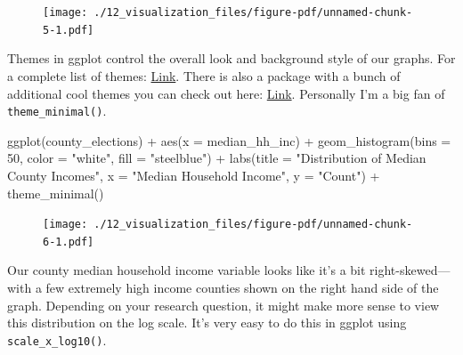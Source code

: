 \documentclass[
  letterpaper,
]{book}
\newenvironment{Shaded}{\begin{snugshade}}{\end{snugshade}}
\newcommand{\AttributeTok}[1]{\textcolor[rgb]{0.40,0.45,0.13}{#1}}
\newcommand{\DecValTok}[1]{\textcolor[rgb]{0.68,0.00,0.00}{#1}}
\newcommand{\FunctionTok}[1]{\textcolor[rgb]{0.28,0.35,0.67}{#1}}
\newcommand{\NormalTok}[1]{\textcolor[rgb]{0.00,0.23,0.31}{#1}}
\newcommand{\SpecialCharTok}[1]{\textcolor[rgb]{0.37,0.37,0.37}{#1}}
\newcommand{\StringTok}[1]{\textcolor[rgb]{0.13,0.47,0.30}{#1}}
\theoremstyle{definition}
\theoremstyle{definition}
\theoremstyle{plain}
\theoremstyle{definition}
\theoremstyle{plain}
\theoremstyle{plain}
\theoremstyle{remark}
\begin{document}
\begin{figure}[H]

{\centering \texttt{[image: ./12\_visualization\_files/figure-pdf/unnamed-chunk-5-1.pdf]}

}

\end{figure}

Themes in ggplot control the overall look and background style of our
graphs. For a complete list of themes:
\href{https://ggplot2.tidyverse.org/reference/ggtheme.html}{Link}. There
is also a package with a bunch of additional cool themes you can check
out here:
\href{https://yutannihilation.github.io/allYourFigureAreBelongToUs/ggthemes/}{Link}.
Personally I'm a big fan of \texttt{theme\_minimal()}.

\begin{Shaded}
\begin{Highlighting}[]
\FunctionTok{ggplot}\NormalTok{(county\_elections) }\SpecialCharTok{+}
  \FunctionTok{aes}\NormalTok{(}\AttributeTok{x =}\NormalTok{ median\_hh\_inc) }\SpecialCharTok{+}
  \FunctionTok{geom\_histogram}\NormalTok{(}\AttributeTok{bins =} \DecValTok{50}\NormalTok{,}
                 \AttributeTok{color =} \StringTok{"white"}\NormalTok{,}
                 \AttributeTok{fill =} \StringTok{"steelblue"}\NormalTok{) }\SpecialCharTok{+}
  \FunctionTok{labs}\NormalTok{(}\AttributeTok{title =} \StringTok{"Distribution of Median County Incomes"}\NormalTok{,}
       \AttributeTok{x =} \StringTok{"Median Household Income"}\NormalTok{,}
       \AttributeTok{y =} \StringTok{"Count"}\NormalTok{) }\SpecialCharTok{+}
  \FunctionTok{theme\_minimal}\NormalTok{()}
\end{Highlighting}
\end{Shaded}

\begin{figure}[H]

{\centering \texttt{[image: ./12\_visualization\_files/figure-pdf/unnamed-chunk-6-1.pdf]}

}

\end{figure}

Our county median household income variable looks like it's a bit
right-skewed---with a few extremely high income counties shown on the
right hand side of the graph. Depending on your research question, it
might make more sense to view this distribution on the log scale. It's
very easy to do this in ggplot using \texttt{scale\_x\_log10()}.
\end{document}
